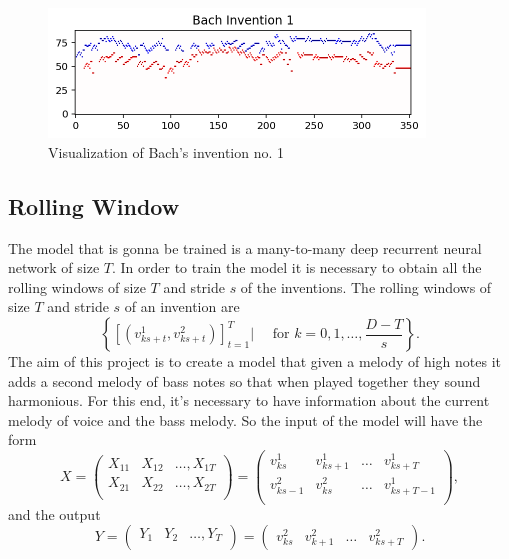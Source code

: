 \documentclass{article}
\begin{document}
\begin{figure}[H]
\includegraphics[width=10cm]{Images/BachPianoRoll.png}
\centering
\caption{Visualization of Bach's invention no. 1}
\end{figure}


\subsection*{Rolling Window}

The model that is gonna be trained is a many-to-many deep recurrent neural network of size $T$. In order to train the model it is necessary to obtain all the rolling windows of size $T$ and stride $s$ of the inventions. The rolling windows of size $T$ and stride $s$ of an invention are
\begin{equation*}
\left\{\left[(v^{1}_{ks+t},v^{2}_{ks+t})\right]_{t=1}^{T}|\quad\text{ for } k=0,1,\dots,\frac{D-T}{s}\right\}.
\end{equation*}
\noindent
The aim of this project is to create a model that given a melody of high notes it adds a second melody of bass notes so that when played together they sound harmonious. For this end, it's necessary to have information about the current melody of voice and the bass melody. So the input of the model will have the form
\begin{equation}
X=\begin{pmatrix}
X_{11}&X_{12}&\dots,X_{1T}\\
X_{21}&X_{22}&\dots,X_{2T}\\
\end{pmatrix} = \begin{pmatrix}
v^{1}_{ks}&v^{1}_{ks+1}&\dots& v^{1}_{ks+T}\\
v^{2}_{ks-1}&v^{2}_{ks}&\dots& v^{1}_{ks+T-1}\\
\end{pmatrix},
\end{equation}
and the output
\begin{equation}
Y =\begin{pmatrix}
Y_{1}&Y_2&\dots,Y_T\\
\end{pmatrix} =  \begin{pmatrix}
v^{2}_{ks}&v^{2}_{k+1}&\dots& v^{2}_{ks+T}
\end{pmatrix}.
\end{equation}
\end{document}
